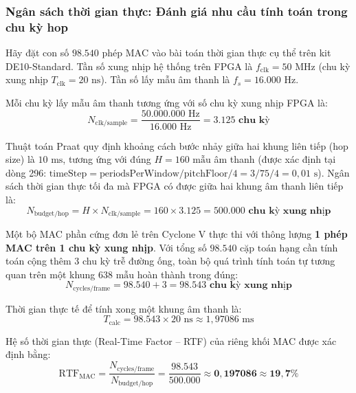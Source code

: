 \subsubsection*{Ngân sách thời gian thực: Đánh giá nhu cầu tính toán trong chu kỳ hop}
Hãy đặt con số $98.540\text{ phép MAC}$ vào bài toán thời gian thực cụ thể trên kit DE10-Standard. Tần số xung nhịp hệ thống trên FPGA là $f_{\text{clk}} = 50\text{ MHz}$ (chu kỳ xung nhịp $T_{\text{clk}} = 20\text{ ns}$). Tần số lấy mẫu âm thanh là $f_s = 16.000\text{ Hz}$. 

Mỗi chu kỳ lấy mẫu âm thanh tương ứng với số chu kỳ xung nhịp FPGA là:
\begin{equation}
N_{\text{clk/sample}} = \frac{50.000.000\text{ Hz}}{16.000\text{ Hz}} = \mathbf{3.125\text{ chu kỳ}}
\end{equation}

Thuật toán Praat quy định khoảng cách bước nhảy giữa hai khung liên tiếp (hop size) là $10\text{ ms}$, tương ứng với đúng $H = 160\text{ mẫu}$ âm thanh (được xác định tại dòng 296: $\text{timeStep} = \text{periodsPerWindow} / \text{pitchFloor} / 4 = 3 / 75 / 4 = 0{,}01\text{ s}$). Ngân sách thời gian thực tối đa mà FPGA có được giữa hai khung âm thanh liên tiếp là:
\begin{equation}
N_{\text{budget/hop}} = H \times N_{\text{clk/sample}} = 160 \times 3.125 = \mathbf{500.000\text{ chu kỳ xung nhịp}}
\end{equation}

Một bộ MAC phần cứng đơn lẻ trên Cyclone V thực thi với thông lượng \textbf{1 phép MAC trên 1 chu kỳ xung nhịp}. Với tổng số $98.540\text{ cặp toán hạng}$ cần tính toán cộng thêm 3 chu kỳ trễ đường ống, toàn bộ quá trình tính toán tự tương quan trên một khung $638\text{ mẫu}$ hoàn thành trong đúng:
\begin{equation}
N_{\text{cycles/frame}} = 98.540 + 3 = \mathbf{98.543\text{ chu kỳ xung nhịp}}
\end{equation}

Thời gian thực tế để tính xong một khung âm thanh là:
\begin{equation}
T_{\text{calc}} = 98.543 \times 20\text{ ns} \approx 1{,}97086\text{ ms}
\end{equation}

Hệ số thời gian thực (Real-Time Factor -- RTF) của riêng khối MAC được xác định bằng:
\begin{equation}
\text{RTF}_{\text{MAC}} = \frac{N_{\text{cycles/frame}}}{N_{\text{budget/hop}}} = \frac{98.543}{500.000} \approx \mathbf{0{,}197086 \approx 19{,}7\%}
\end{equation}

